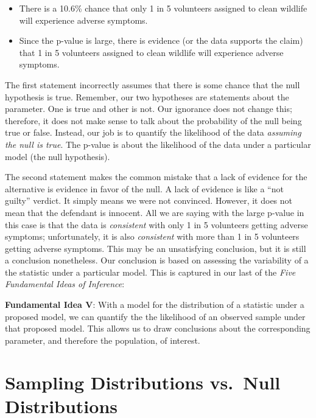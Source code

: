 \documentclass[]{book}
\providecommand{\tightlist}{%
  \setlength{\itemsep}{0pt}\setlength{\parskip}{0pt}}
\theoremstyle{plain}
\theoremstyle{mydefn}
\theoremstyle{myexmpl}
\theoremstyle{remark}
\let\BeginKnitrBlock\begin \let\EndKnitrBlock\end
\let\BeginKnitrBlock\begin \let\EndKnitrBlock\end
\begin{document}
\begin{itemize}
\tightlist
\item
  There is a 10.6\% chance that only 1 in 5 volunteers assigned to clean
  wildlife will experience adverse symptoms.
\item
  Since the p-value is large, there is evidence (or the data supports
  the claim) that 1 in 5 volunteers assigned to clean wildlife will
  experience adverse symptoms.
\end{itemize}

The first statement incorrectly assumes that there is some chance that
the null hypothesis is true. Remember, our two hypotheses are statements
about the parameter. One is true and other is not. Our ignorance does
not change this; therefore, it does not make sense to talk about the
probability of the null being true or false. Instead, our job is to
quantify the likelihood of the data \emph{assuming the null is true}.
The p-value is about the likelihood of the data under a particular model
(the null hypothesis).

The second statement makes the common mistake that a lack of evidence
for the alternative is evidence in favor of the null. A lack of evidence
is like a ``not guilty'' verdict. It simply means we were not convinced.
However, it does not mean that the defendant is innocent. All we are
saying with the large p-value in this case is that the data is
\emph{consistent} with only 1 in 5 volunteers getting adverse symptoms;
unfortunately, it is also \emph{consistent} with more than 1 in 5
volunteers getting adverse symptoms. This may be an unsatisfying
conclusion, but it is still a conclusion nonetheless. Our conclusion is
based on assessing the variability of a the statistic under a particular
model. This is captured in our last of the \emph{Five Fundamental Ideas
of Inference}:

\BeginKnitrBlock{rmdfivefund}
\textbf{Fundamental Idea V}: With a model for the distribution of a
statistic under a proposed model, we can quantify the the likelihood of
an observed sample under that proposed model. This allows us to draw
conclusions about the corresponding parameter, and therefore the
population, of interest.
\EndKnitrBlock{rmdfivefund}

\section{Sampling Distributions vs.~Null
Distributions}\label{sampling-distributions-vs.null-distributions}
\end{document}
